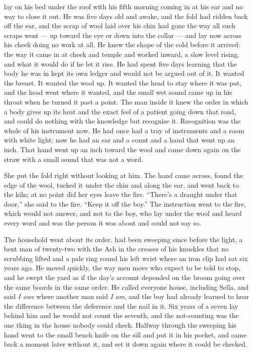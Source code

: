  lay on his bed under the roof with his fifth morning coming in at his ear and no way to close it out. He was five days old and awake, and the fold had ridden back off the ear, and the scrap of wool laid over his chin had gone the way all such scraps went --- up toward the eye or down into the collar --- and lay now across his cheek doing no work at all. He knew the shape of the cold before it arrived: the way it came in at cheek and temple and worked inward, a slow level rising, and what it would do if he let it rise. He had spent five days learning that the body he was in kept its own ledger and would not be argued out of it. It wanted the breast. It wanted the wool up. It wanted the head to stay where it was put, and the head went where it wanted, and the small wet sound came up in his throat when he turned it past a point. The man inside it knew the order in which a body gives up its heat and the exact feel of a patient going down that road, and could do nothing with the knowledge but recognise it. Recognition was the whole of his instrument now. He had once had a tray of instruments and a room with white light; now he had an ear and a count and a hand that went up an inch. That hand went up an inch toward the wool and came down again on the straw with a small sound that was not a word.

She put the fold right without looking at him. The hand came across, found the edge of the wool, tucked it under the chin and along the ear, and went back to the kiln; at no point did her eyes leave the fire. “There's a draught under that door,” she said to the fire. “Keep it off the boy.” The instruction went to the fire, which would not answer, and not to the boy, who lay under the wool and heard every word and was the person it was about and could not say so.

\scenebreak

The household went about its order.  had been sweeping since before the light, a bent man of twenty-two with the Ash in the creases of his knuckles that no scrubbing lifted and a pale ring round his left wrist where an iron clip had sat six years ago. He moved quickly, the way men move who expect to be told to stop, and he swept the yard as if the day's account depended on the broom going over the same boards in the same order. He called everyone house, including Sella, and said \emph{I owe} where another man said \emph{I am}, and the boy had already learned to hear the difference between the deference and the nail in it. Six years of a seven lay behind him and he would not count the seventh, and the not-counting was the one thing in the house nobody could check. Halfway through the sweeping his hand went to the small bench knife on the sill and put it in his pocket, and came back a moment later without it, and set it down again where it could be checked.

